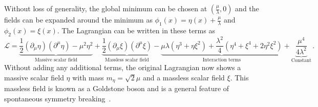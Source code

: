 Without loss of generality, the global minimum can be chosen at $(\frac{\mu}{\lambda},0)$ and the fields can be expanded around the minimum as $\phi_1(x)=\eta(x)+\frac{\mu}{\lambda}$ and $\phi_2(x)=\xi(x)$. The Lagrangian can be written in these terms as
\begin{equation}
	\mathcal{L}=\underbrace{\frac{1}{2}(\partial_\mu\eta)(\partial^\mu\eta)-\mu^2\eta^2}_\text{Massive scalar field}+\underbrace{\frac{1}{2}(\partial_\mu\xi)(\partial^\mu\xi)}_\text{Massless scalar field}-\underbrace{\mu\lambda(\eta^3+\eta\xi^2)+\frac{\lambda^2}{4}(\eta^4+\xi^4+2\eta^2\xi^2)}_\text{Interaction terms} + \underbrace{\frac{\mu^4}{4\lambda^2}}_\text{Constant}\,.
\end{equation}
Without adding any additional terms, the original Lagrangian now shows a massive scalar field $\eta$ with mass $m_\eta=\sqrt{2}\mu$ and a massless scalar field $\xi$. This massless field is known as a Goldstone boson and is a general feature of spontaneous symmetry breaking~\cite{goldstone}.

